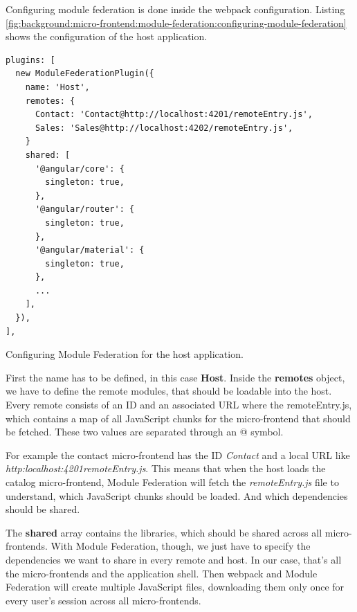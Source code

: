 Configuring module federation is done inside the webpack configuration. Listing \ref{fig:background:micro-frontend:module-federation:configuring-module-federation} shows the configuration of the host application.

\ifshowListings
\begin{listing}[H]
    \begin{verbatim}
plugins: [
  new ModuleFederationPlugin({
    name: 'Host',
    remotes: {
      Contact: 'Contact@http://localhost:4201/remoteEntry.js',
      Sales: 'Sales@http://localhost:4202/remoteEntry.js',
    }
    shared: [
      '@angular/core': {
        singleton: true,
      },
      '@angular/router': {
        singleton: true,
      },
      '@angular/material': {
        singleton: true,
      },
      ...
    ],
  }),
],
    \end{verbatim}
    \caption{Configuring Module Federation for the host application.}\label{fig:background:micro-frontend:module-federation:configuring-module-federation}
\end{listing}
\fi

\noindent First the name has to be defined, in this case \textbf{Host}. Inside the \textbf{remotes} object, we have to define the remote modules, that should be loadable into the host. Every remote consists of an ID and an associated URL where the remoteEntry.js, which contains a map of all JavaScript chunks for the micro-frontend that should be fetched. These two values are separated through an @ symbol. \cite[124]{book:2021:mezzalira:applied-methods:building-micro-frontends}

\noindent For example the contact micro-frontend has the ID \textit{Contact} and a local URL like \textit{http:\/\/localhost:4201\/remoteEntry.js}. This means that when the host loads the catalog micro-frontend, Module Federation will fetch the \textit{remoteEntry.js} file to understand, which JavaScript chunks should be loaded. And which dependencies should be shared. \cite[125]{book:2021:mezzalira:applied-methods:building-micro-frontends}

\noindent The \textbf{shared} array contains the libraries, which should be shared across all micro-frontends. With Module Federation, though, we just have to specify the dependencies we want to share in every remote and host. In our case, that's all the micro-frontends and the application shell. Then webpack and Module Federation will create multiple JavaScript files, downloading them only once for every user's session across all micro-frontends. \cite[125]{book:2021:mezzalira:applied-methods:building-micro-frontends}

